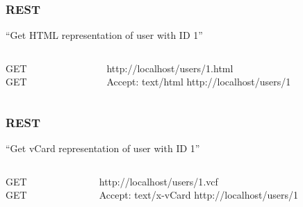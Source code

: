 \begin{frame}
  \frametitle{REST}
  \begin{center}
  ``Get HTML representation of user with ID 1''
  \end{center}
  \begin{columns}
    \begin{column}{.2\textwidth}
      \begin{flushright}
      GET\\
      GET
      \end{flushright}
    \end{column}    
    \begin{column}{.8\textwidth}
      \begin{flushleft}
      http://localhost/users/1\alert{.html}\\
      \alert{Accept: text/html} http://localhost/users/1
      \end{flushleft}
    \end{column}    
  \end{columns}
\end{frame}

\begin{frame}
  \frametitle{REST}
  \begin{center}
  ``Get vCard representation of user with ID 1''
  \end{center}
  \begin{columns}
    \begin{column}{.2\textwidth}
      \begin{flushright}
      GET\\
      GET
      \end{flushright}
    \end{column}    
    \begin{column}{.8\textwidth}
      \begin{flushleft}
      http://localhost/users/1\alert{.vcf}\\
      \alert{Accept: text/x-vCard} http://localhost/users/1
      \end{flushleft}
    \end{column}    
  \end{columns}
\end{frame}

